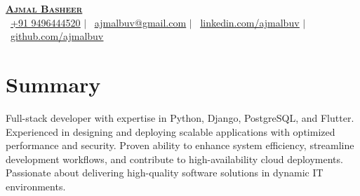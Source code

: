 \documentclass[a4paper,11pt]{article}
\begin{document}
\begin{minipage}[c]{0.15\textwidth}
\end{minipage}
\begin{minipage}[t]{0.84\textwidth}  %
	\begin{center}
		{\selectfont \textbf{\Huge \scshape \href{https://ajmalbuv.github.io}{Ajmal Basheer}}} \\ \vspace{1pt}
		\small{
			\raisebox{-0.1\height}\faPhone\ \href{tel:+919496444520}{\underline{+91 9496444520}} $|$
			\raisebox{-0.2\height}\faEnvelope\ \href{mailto:ajmalbuv@gmail.com}{\underline{ajmalbuv@gmail.com}} $|$
			\raisebox{-0.2\height}\faLinkedin\ \href{https://linkedin.com/in/ajmalbuv}{\underline{linkedin.com/ajmalbuv}} $|$
			\raisebox{-0.2\height}\faGithub\ \href{https://github.com/ajmalbuv}{\underline{github.com/ajmalbuv}}
		}
	\end{center}
\end{minipage}


\section{Summary}
\begin{itemize}[leftmargin=0.15in, label={}]
	\small{\item{
				Full-stack developer with expertise in Python, Django, PostgreSQL, and Flutter. Experienced in designing and deploying scalable applications with optimized performance and security. Proven ability to enhance system efficiency, streamline development workflows, and contribute to high-availability cloud deployments. Passionate about delivering high-quality software solutions in dynamic IT environments.
				}}
\end{itemize}
\end{document}
